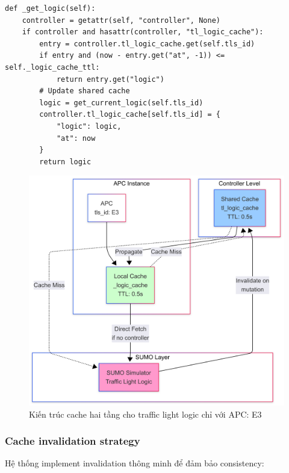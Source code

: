 \documentclass[12pt,a4paper,oneside]{report}
\begin{document}
\begin{lstlisting}[style=py, caption={Shared cache mechanism (chỉ với tls\_id: E3)}]
def _get_logic(self):
    controller = getattr(self, "controller", None)
    if controller and hasattr(controller, "tl_logic_cache"):
        entry = controller.tl_logic_cache.get(self.tls_id)
        if entry and (now - entry.get("at", -1)) <= self._logic_cache_ttl:
            return entry.get("logic")
        # Update shared cache
        logic = get_current_logic(self.tls_id)
        controller.tl_logic_cache[self.tls_id] = {
            "logic": logic, 
            "at": now
        }
        return logic
\end{lstlisting}

\vspace{1cm}

\begin{figure}[H]
    \centering
    \includegraphics[width=0.85\linewidth]{Untitled diagram _ Mermaid Chart-2025-08-22-044929.png}
    \caption{Kiến trúc cache hai tầng cho traffic light logic chỉ với APC: E3}
    \label{fig:cache_architecture}
\end{figure}

\subsubsection{Cache invalidation strategy}

Hệ thống implement invalidation thông minh để đảm bảo consistency:
\end{document}
